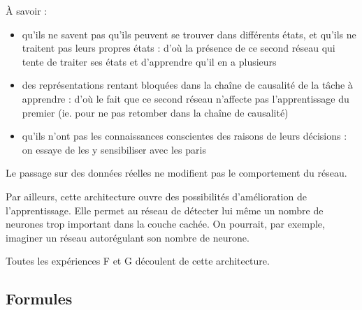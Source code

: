     À savoir :
    \begin{itemize}
    \item qu'ils ne savent pas qu'ils peuvent se trouver dans différents états, et qu'ils ne traitent pas leurs propres états : 
    d'où la présence de ce second réseau qui tente de traiter ses états et d'apprendre qu'il en a plusieurs
    \item des représentations rentant bloquées dans la chaîne de causalité de la tâche à apprendre : d'où
    le fait que ce second réseau n'affecte pas l'apprentissage du premier (ie. pour ne pas retomber dans la chaîne de causalité)
    \item qu'ils n'ont pas les connaissances conscientes des raisons de leurs décisions : on essaye de les y sensibiliser avec les paris
    \\[0.2cm]
    \end{itemize}
  
    Le passage sur des données réelles ne modifient pas le comportement du réseau.
    
    
    Par ailleurs, cette architecture ouvre des possibilités d'amélioration de l'apprentissage.
    Elle permet au réseau de détecter lui même un nombre de neurones trop important dans la couche cachée.
    On pourrait, par exemple, imaginer un réseau autorégulant son nombre de neurone.
    
    Toutes les expériences F et G découlent de cette architecture.
  

  \newpage 
  \subsection{Formules}
    
    
    


